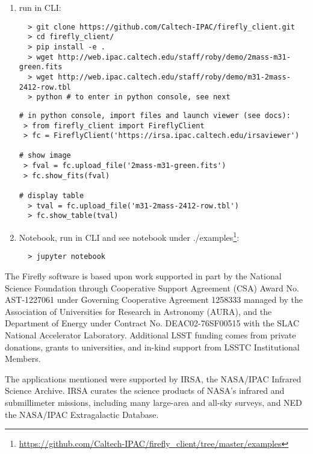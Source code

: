 \documentclass[11pt,twoside]{article}
\begin{document}
\begin{enumerate}
  \item run in CLI:
\begin{verbatim}
  > git clone https://github.com/Caltech-IPAC/firefly_client.git
  > cd firefly_client/
  > pip install -e .
  > wget http://web.ipac.caltech.edu/staff/roby/demo/2mass-m31-green.fits
  > wget http://web.ipac.caltech.edu/staff/roby/demo/m31-2mass-2412-row.tbl
  > python # to enter in python console, see next
\end{verbatim}

\begin{verbatim}
# in python console, import files and launch viewer (see docs):
 > from firefly_client import FireflyClient
 > fc = FireflyClient('https://irsa.ipac.caltech.edu/irsaviewer')

# show image
 > fval = fc.upload_file('2mass-m31-green.fits')
 > fc.show_fits(fval)

# display table
  > tval = fc.upload_file('m31-2mass-2412-row.tbl')
  > fc.show_table(tval)
\end{verbatim}
\item Notebook, run in CLI and see notebook under ./examples\footnote{\url{https://github.com/Caltech-IPAC/firefly_client/tree/master/examples}}:
\begin{verbatim}
  > jupyter notebook
\end{verbatim}
\end{enumerate}

\acknowledgements

The Firefly software is based upon work supported in part by the National
Science Foundation through Cooperative Support Agreement (CSA) Award No. AST-1227061 under Governing
Cooperative Agreement 1258333 managed by the Association of Universities for Research in Astronomy (AURA), and
the Department of Energy under Contract No. DEAC02-76SF00515 with the SLAC National Accelerator Laboratory.
Additional LSST funding comes from private donations, grants to universities, and in-kind support from LSSTC
Institutional Members.

\smallskip
The applications mentioned were supported by IRSA, the NASA/IPAC Infrared Science Archive. IRSA curates the science
products of NASA's infrared and submillimeter missions, including many large-area and all-sky surveys, and NED the NASA/IPAC Extragalactic Database.

\end{document}
